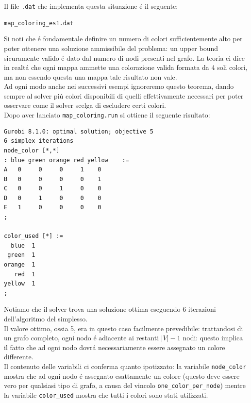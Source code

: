 \documentclass{article}
\begin{document}
Il file \texttt{.dat} che implementa questa situazione \'e il seguente:

\vspace{5mm}
\texttt{map\_coloring\_es1.dat}

\vspace{5mm}

Si noti che \'e fondamentale definire un numero di colori sufficientemente alto per poter ottenere una soluzione ammissibile del problema: un upper bound sicuramente valido \'e dato dal numero di nodi presenti nel grafo. La teoria ci dice in realt\'a che ogni mappa ammette una colorazione valida formata da 4 soli colori, ma non essendo questa una mappa tale risultato non vale.\\
Ad ogni modo anche nei successivi esempi ignoreremo questo teorema, dando sempre al solver pi\'u colori disponibili di quelli effettivamente necessari per poter osservare come il solver scelga di escludere certi colori.\\

Dopo aver lanciato \texttt{map\_coloring.run} si ottiene il seguente risultato:\\

\begin{verbatim}
Gurobi 8.1.0: optimal solution; objective 5
6 simplex iterations
node_color [*,*]
: blue green orange red yellow    :=
A   0     0     0     1    0
B   0     0     0     0    1
C   0     0     1     0    0
D   0     1     0     0    0
E   1     0     0     0    0
;

color_used [*] :=
  blue  1
 green  1
orange  1
   red  1
yellow  1
;
\end{verbatim}

Notiamo che il solver trova una soluzione ottima eseguendo 6 iterazioni dell'algoritmo del simplesso.\\
Il valore ottimo, ossia 5, era in questo caso facilmente prevedibile: trattandosi di un grafo completo, ogni nodo \'e adiacente ai restanti $|V| - 1$ nodi: questo implica il fatto che ad ogni nodo dovr\'a necessariamente essere assegnato un colore differente.\\
Il contenuto delle variabili ci conferma quanto ipotizzato: la variabile \texttt{node\_color} mostra che ad ogni nodo \'e assegnato esattamente un colore (questo deve essere vero per qualsiasi tipo di grafo, a causa del vincolo \texttt{one\_color\_per\_node}) mentre la variabile \texttt{color\_used} mostra che tutti i colori sono stati utilizzati.\\
\end{document}
